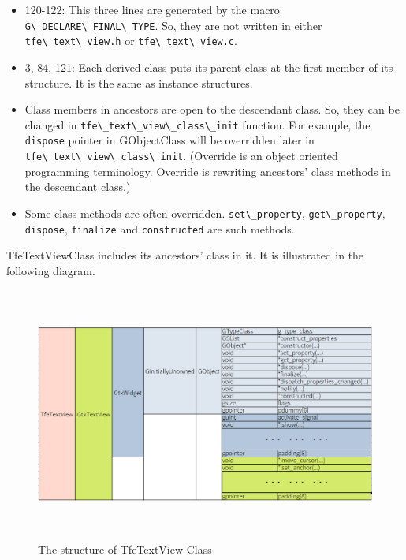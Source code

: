 \begin{itemize}
\tightlist
\item
  120-122: This three lines are generated by the macro
  \passthrough{\lstinline!G\_DECLARE\_FINAL\_TYPE!}. So, they are not
  written in either \passthrough{\lstinline!tfe\_text\_view.h!} or
  \passthrough{\lstinline!tfe\_text\_view.c!}.
\item
  3, 84, 121: Each derived class puts its parent class at the first
  member of its structure. It is the same as instance structures.
\item
  Class members in ancestors are open to the descendant class. So, they
  can be changed in
  \passthrough{\lstinline!tfe\_text\_view\_class\_init!} function. For
  example, the \passthrough{\lstinline!dispose!} pointer in GObjectClass
  will be overridden later in
  \passthrough{\lstinline!tfe\_text\_view\_class\_init!}. (Override is
  an object oriented programming terminology. Override is rewriting
  ancestors' class methods in the descendant class.)
\item
  Some class methods are often overridden.
  \passthrough{\lstinline!set\_property!},
  \passthrough{\lstinline!get\_property!},
  \passthrough{\lstinline!dispose!}, \passthrough{\lstinline!finalize!}
  and \passthrough{\lstinline!constructed!} are such methods.
\end{itemize}

TfeTextViewClass includes its ancestors' class in it. It is illustrated
in the following diagram.

\begin{figure}
\centering
\includegraphics[width=16.02cm,height=8.34cm]{../image/TfeTextViewClass.png}
\caption{The structure of TfeTextView Class}
\end{figure}

